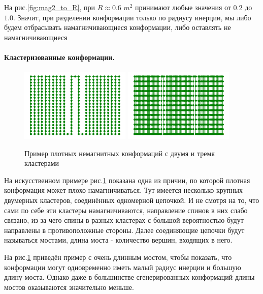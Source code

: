 На рис.\ref{fig:mag2_to_R}, при $R \approx 0.6$ $m^2$ принимают любые значения от $0.2$ до $1.0$. Значит, при разделении конформации только по радиусу инерции, мы либо будем отбрасывать намагничивающиеся конформации, либо оставлять не намагничивающиеся

\paragraph{Кластеризованные конформации.} \label{par:clusterized_conformations}

\begin{figure}[h!]
	\centering
	\includegraphics[width=0.47\textwidth]{../images/2Cluster_conformation.png}
	\includegraphics[width=0.47\textwidth]{../images/3Cluster_conformation.png} 
	\caption{Пример плотных немагнитных конформаций с двумя и тремя кластерами}
	\label{fig:synth_cluster_conf}
\end{figure}

На искусственном примере рис.\ref{fig:synth_cluster_conf} показана одна из причин, по которой плотная конформация может плохо намагничиваться. Тут имеется несколько крупных двумерных кластеров, соединённых одномерной цепочкой. И не смотря на то, что сами по себе эти кластеры намагничиваются, направление спинов в них слабо связано, из-за чего спины в разных кластерах с большой вероятностью будут направлены в противоположные стороны. Далее соединяющие цепочки будут называться мостами, длина моста - количество вершин, входящих в него.

На рис.\ref{fig:synth_cluster_conf} приведён пример с очень длинным мостом, чтобы показать, что конформации могут одновременно иметь малый радиус инерции и большую длину моста. Однако даже в большинстве сгенерированных конформаций длины мостов оказываются значительно меньше.

